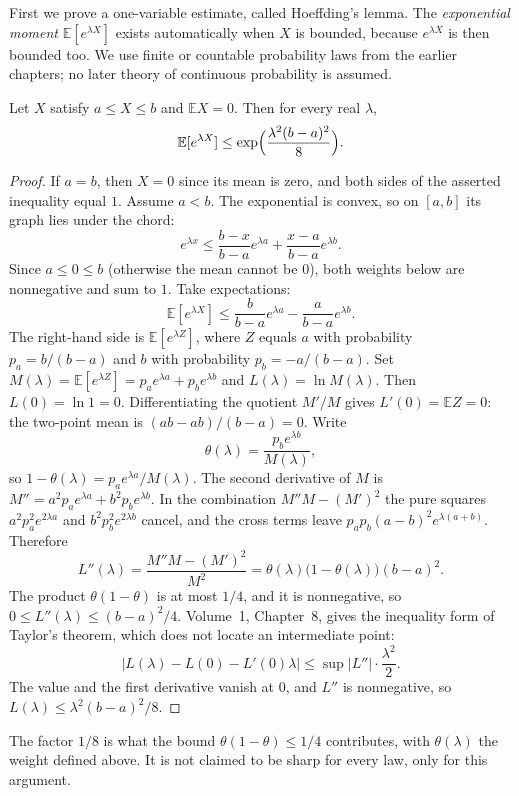 First we prove a one-variable estimate, called Hoeffding's lemma. The \emph{exponential moment} $\mathbb E[e^{\lambda X}]$ exists automatically when $X$ is bounded, because $e^{\lambda X}$ is then bounded too. We use finite or countable probability laws from the earlier chapters; no later theory of continuous probability is assumed.

\begin{lemma}\label{lem:hoeffding}
Let $X$ satisfy $a\le X\le b$ and $\mathbb E X=0$. Then for every real $\lambda$,
\[
 \mathbb E[e^{\lambda X}]\le\exp\Bigl(\frac{\lambda^2(b-a)^2}{8}\Bigr).
\]
\end{lemma}
\begin{proof}
If $a=b$, then $X=0$ since its mean is zero, and both sides of the asserted inequality equal $1$. Assume $a<b$. The exponential is convex, so on $[a,b]$ its graph lies under the chord:
\[
 e^{\lambda x}\le\frac{b-x}{b-a}e^{\lambda a}+\frac{x-a}{b-a}e^{\lambda b}.
\]
Since $a\le0\le b$ (otherwise the mean cannot be $0$), both weights below are nonnegative and sum to $1$. Take expectations:
\[
 \mathbb E[e^{\lambda X}]\le\frac{b}{b-a}e^{\lambda a}-\frac{a}{b-a}e^{\lambda b}.
\]
The right-hand side is $\mathbb E[e^{\lambda Z}]$, where $Z$ equals $a$ with probability $p_a=b/(b-a)$ and $b$ with probability $p_b=-a/(b-a)$. Set $M(\lambda)=\mathbb E[e^{\lambda Z}]=p_a e^{\lambda a}+p_b e^{\lambda b}$ and $L(\lambda)=\ln M(\lambda)$. Then $L(0)=\ln 1=0$. Differentiating the quotient $M'/M$ gives $L'(0)=\mathbb E Z=0$: the two-point mean is $(ab-ab)/(b-a)=0$. Write
\[
 \theta(\lambda)=\frac{p_b e^{\lambda b}}{M(\lambda)},
\]
so $1-\theta(\lambda)=p_a e^{\lambda a}/M(\lambda)$. The second derivative of $M$ is $M''=a^2 p_a e^{\lambda a}+b^2 p_b e^{\lambda b}$. In the combination $M''M-(M')^2$ the pure squares $a^2 p_a^2 e^{2\lambda a}$ and $b^2 p_b^2 e^{2\lambda b}$ cancel, and the cross terms leave $p_a p_b(a-b)^2 e^{\lambda(a+b)}$. Therefore
\[
 L''(\lambda)=\frac{M''M-(M')^2}{M^2}=\theta(\lambda)\bigl(1-\theta(\lambda)\bigr)(b-a)^2.
\]
The product $\theta(1-\theta)$ is at most $1/4$, and it is nonnegative, so $0\le L''(\lambda)\le(b-a)^2/4$. Volume~1, Chapter~8, gives the inequality form of Taylor's theorem, which does not locate an intermediate point:
\[
 \bigl|L(\lambda)-L(0)-L'(0)\lambda\bigr|\le\sup|L''|\cdot\frac{\lambda^2}{2}.
\]
The value and the first derivative vanish at $0$, and $L''$ is nonnegative, so $L(\lambda)\le\lambda^2(b-a)^2/8$.
\end{proof}

The factor $1/8$ is what the bound $\theta(1-\theta)\le1/4$ contributes, with $\theta(\lambda)$ the weight defined above. It is not claimed to be sharp for every law, only for this argument.

